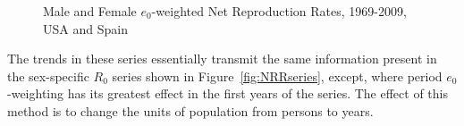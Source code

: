 \begin{figure}[ht!]
        \centering  
          \caption{Male and Female $e_0$-weighted Net Reproduction Rates,
          1969-2009, USA and Spain}
          \label{fig:R0perHenry}
\end{figure}

The trends in these series essentially transmit the same information
present in the sex-specific $R_0$ series shown in Figure~\ref{fig:NRRseries},
except, where period $e_0$-weighting has its greatest effect in the first years
of the series. The effect of this method is to change the units of population
from persons to years. 
